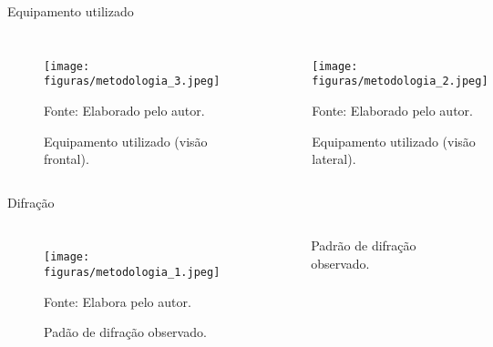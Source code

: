 \begin{frame}{Equipamento utilizado}

    \begin{columns}[c]
        \begin{figure}
          \centering
          \caption{Equipamento utilizado (visão frontal).}
          \texttt{[image: figuras/metodologia\_3.jpeg]}\par
          {\scriptsize Fonte: Elaborado pelo autor.}
        \end{figure}

        \begin{figure}
          \centering
          \caption{Equipamento utilizado (visão lateral).}
          \texttt{[image: figuras/metodologia\_2.jpeg]}\par
          {\scriptsize Fonte: Elaborado pelo autor.}
        \end{figure}

    \end{columns}

    
\end{frame}


\begin{frame}{Difração}

    \begin{columns}[c]
        \begin{figure}
          \centering
          \caption{Padão de difração observado.}
          \texttt{[image: figuras/metodologia\_1.jpeg]}\par
        {\scriptsize Fonte: Elabora pelo autor.}
        \end{figure}

        Padrão de difração observado.
    \end{columns}

    
\end{frame}
